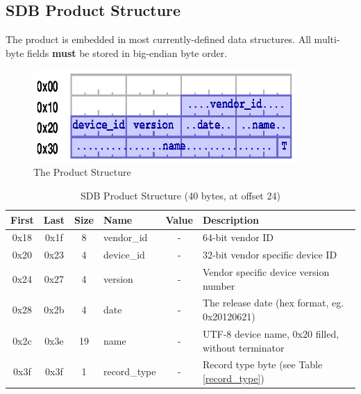 \documentclass[a4paper, 12pt]{article}
\begin{document}
\subsection{SDB Product Structure}

The product is embedded in most currently-defined data structures.
All multi-byte fields \textbf{must} be stored in big-endian byte order.

\begin{figure}[h]
\centering%
\includegraphics[width=100mm]{img/sdb-product.ps}
\caption{The Product Structure}
\label{fig:FigureProduct}
\end{figure}

\begin{center}
  \begin{savenotes}
    \begin{table}[!ht]\footnotesize
      \caption{SDB Product Structure (40 bytes, at offset 24)}\label{sdb_product}\centering
        \begin{tabular}{| c | c | c | l | c | p{5cm} |} \hline
        First & Last & Size & Name & Value & Description \\ \hline
        0x18 & 0x1f & 8 & vendor\_id & - & 64-bit vendor ID \\ \hline
        0x20 & 0x23 & 4 & device\_id & - & 32-bit vendor specific device ID \\ \hline
        0x24 & 0x27 & 4 & version & - & Vendor specific device version number \\ \hline
        0x28 & 0x2b & 4 & date & - & The release date (hex format, eg. 0x20120621) \\ \hline
        0x2c & 0x3e & 19 & name & - & UTF-8 device name, 0x20 filled, without terminator \\ \hline
        0x3f & 0x3f & 1 & record\_type & - & Record type byte (see Table \ref{record_type}) \\ \hline
        \end{tabular}
    \end{table}
  \end{savenotes}
\end{center}
\end{document}
